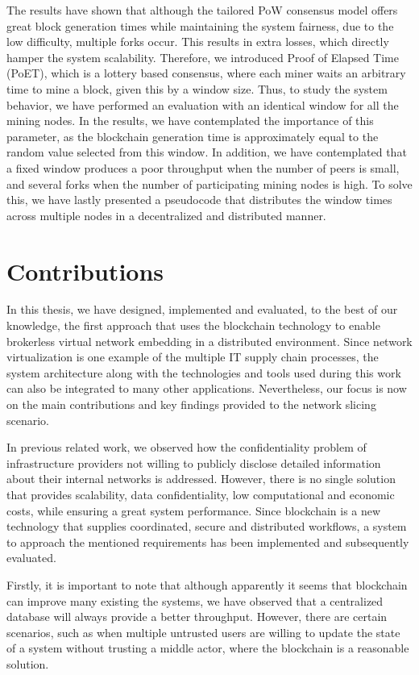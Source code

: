 The results have shown that although the tailored PoW consensus model offers great block generation times while maintaining the system fairness, due to the low difficulty, multiple forks occur. This results in extra losses, which directly hamper the system scalability. Therefore, we introduced Proof of Elapsed Time (PoET), which is a lottery based consensus, where each miner waits an arbitrary time to mine a block, given this by a window size. Thus, to study the system behavior, we have performed an evaluation with an identical window for all the mining nodes. In the results, we have contemplated the importance of this parameter, as the blockchain generation time is approximately equal to the random value selected from this window. In addition, we have contemplated that a fixed window produces a poor throughput when the number of peers is small, and several forks when the number of participating mining nodes is high. To solve this, we have lastly presented a pseudocode that distributes the window times across multiple nodes in a decentralized and distributed manner.

\section{Contributions}

In this thesis, we have designed, implemented and evaluated, to the best of our knowledge, the first approach that uses the blockchain technology to enable brokerless virtual network embedding in a distributed environment. Since network virtualization is one example of the multiple IT supply chain processes, the system architecture along with the technologies and tools used during this work can also be integrated to many other applications. Nevertheless, our focus is now on the main contributions and key findings provided to the network slicing scenario.

In previous related work, we observed how the confidentiality problem of infrastructure providers not willing to publicly disclose detailed information about their internal networks is addressed. However, there is no single solution that provides scalability, data confidentiality, low computational and economic costs, while ensuring a great system performance. Since blockchain is a new technology that supplies coordinated, secure and distributed workflows, a system to approach the mentioned requirements has been implemented and subsequently evaluated.

Firstly, it is important to note that although apparently it seems that blockchain can improve many existing the systems, we have observed that a centralized database will always provide a better throughput. However, there are certain scenarios, such as when multiple untrusted users are willing to update the state of a system without trusting a middle actor, where the blockchain is a reasonable solution.


